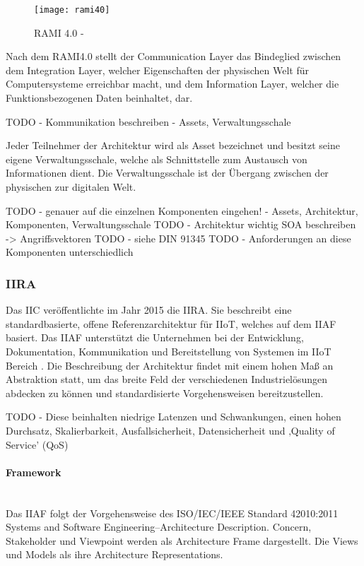 \begin{figure}[h]
  \centering
  \texttt{[image: rami40]}
  \caption{RAMI 4.0 - \cite{rami2016}}
  \label{Kap2:RAMI 4.0}
\end{figure}

\clearpage

Nach dem \ac{RAMI4.0} stellt der Communication Layer das Bindeglied zwischen dem Integration Layer, welcher Eigenschaften der physischen Welt für Computersysteme erreichbar macht, und dem Information Layer, welcher die Funktionsbezogenen Daten beinhaltet, dar. \cite{BMWiNeCon2016} 

TODO - Kommunikation beschreiben - Assets, Verwaltungsschale

Jeder Teilnehmer der Architektur wird als Asset bezeichnet und besitzt seine eigene Verwaltungsschale, welche als Schnittstelle zum Austausch von Informationen dient. Die Verwaltungsschale ist der Übergang zwischen der physischen zur digitalen Welt.

TODO - genauer auf die einzelnen Komponenten eingehen! - Assets, Architektur, Komponenten, Verwaltungsschale
TODO - Architektur wichtig SOA beschreiben -> Angriffsvektoren
TODO - siehe DIN 91345
TODO - Anforderungen an diese Komponenten unterschiedlich

\subsubsection{IIRA}
Das \ac{IIC} veröffentlichte im Jahr 2015 die \ac{IIRA}. Sie beschreibt eine standardbasierte, offene Referenzarchitektur für \ac{IIoT}, welches auf dem \ac{IIAF} basiert. Das \ac{IIAF} unterstützt die Unternehmen bei der Entwicklung, Dokumentation, Kommunikation und Bereitstellung von Systemen im \ac{IIoT} Bereich \cite{iira2017}. Die Beschreibung der Architektur findet mit einem hohen Maß an Abstraktion statt, um das breite Feld der verschiedenen Industrielösungen abdecken zu können und standardisierte Vorgehensweisen bereitzustellen.

TODO - Diese beinhalten niedrige Latenzen und Schwankungen, einen hohen Durchsatz, Skalierbarkeit, Ausfallsicherheit, Datensicherheit und ‚Quality of Service’ (QoS)

\paragraph{Framework}\mbox{}\\
Das \ac{IIAF} folgt der Vorgehensweise des ISO/IEC/IEEE Standard 42010:2011 Systems and Software Engineering–Architecture Description. Concern, Stakeholder und Viewpoint werden als Architecture Frame dargestellt. Die Views und Models als ihre Architecture Representations.


